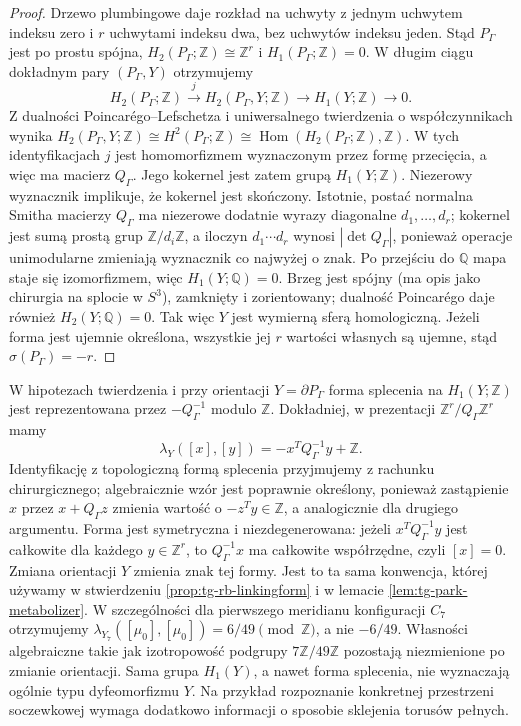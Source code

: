 \begin{proof}
Drzewo plumbingowe daje rozkład na uchwyty z jednym uchwytem indeksu
zero i $r$ uchwytami indeksu dwa, bez uchwytów indeksu jeden.
Stąd $P_\Gamma$ jest po prostu spójna,
$H_2(P_\Gamma;\mathbb Z)\cong\mathbb Z^r$ i
$H_1(P_\Gamma;\mathbb Z)=0$. W długim ciągu dokładnym pary
$(P_\Gamma,Y)$ otrzymujemy
\[
 H_2(P_\Gamma;\mathbb Z)\xrightarrow{j}
 H_2(P_\Gamma,Y;\mathbb Z)\longrightarrow
 H_1(Y;\mathbb Z)\longrightarrow0.
\]
Z dualności Poincar\'ego--Lefschetza i uniwersalnego twierdzenia
o współczynnikach wynika
$H_2(P_\Gamma,Y;\mathbb Z)\cong H^2(P_\Gamma;\mathbb Z)
\cong\operatorname{Hom}(H_2(P_\Gamma;\mathbb Z),\mathbb Z)$.
W tych identyfikacjach $j$ jest homomorfizmem wyznaczonym przez
formę przecięcia, a więc ma macierz $Q_\Gamma$. Jego kokernel
jest zatem grupą $H_1(Y;\mathbb Z)$. Niezerowy wyznacznik
implikuje, że kokernel jest skończony. Istotnie,
postać normalna Smitha macierzy $Q_\Gamma$ ma
niezerowe dodatnie wyrazy diagonalne $d_1,\ldots,d_r$;
kokernel jest sumą prostą grup $\mathbb Z/d_i\mathbb Z$,
a iloczyn $d_1\cdots d_r$ wynosi $|\det Q_\Gamma|$,
ponieważ operacje unimodularne zmieniają wyznacznik
co najwyżej o znak. Po przejściu do $\mathbb Q$ mapa staje się
izomorfizmem, więc $H_1(Y;\mathbb Q)=0$.
Brzeg jest spójny (ma opis jako chirurgia na splocie
w $S^3$), zamknięty i zorientowany; dualność
Poincarégo daje również $H_2(Y;\mathbb Q)=0$.
Tak więc $Y$ jest wymierną sferą homologiczną.
Jeżeli forma jest ujemnie określona, wszystkie jej $r$
wartości własnych są ujemne, stąd $\sigma(P_\Gamma)=-r$.
\end{proof}

\begin{uwaga}
W hipotezach twierdzenia i przy orientacji $Y=\partial P_\Gamma$
forma splecenia na $H_1(Y;\mathbb Z)$ jest reprezentowana
przez $-Q_\Gamma^{-1}$ modulo $\mathbb Z$. Dokładniej,
w prezentacji $\mathbb Z^r/Q_\Gamma\mathbb Z^r$ mamy
\[
 \lambda_Y([x],[y])=-x^TQ_\Gamma^{-1}y+\mathbb Z.
\]
Identyfikację z topologiczną formą splecenia
przyjmujemy z rachunku chirurgicznego; algebraicznie
wzór jest poprawnie określony, ponieważ zastąpienie
$x$ przez $x+Q_\Gamma z$ zmienia wartość o
$-z^Ty\in\mathbb Z$, a analogicznie dla drugiego
argumentu. Forma jest symetryczna i niezdegenerowana:
jeżeli $x^TQ_\Gamma^{-1}y$ jest całkowite dla
każdego $y\in\mathbb Z^r$, to $Q_\Gamma^{-1}x$
ma całkowite współrzędne, czyli $[x]=0$.
Zmiana orientacji $Y$ zmienia znak tej formy.
Jest to ta sama konwencja, której używamy w stwierdzeniu
\ref{prop:tg-rb-linkingform} i w lemacie
\ref{lem:tg-park-metabolizer}. W szczególności dla
pierwszego meridianu konfiguracji $C_7$ otrzymujemy
$\lambda_{Y_7}([\mu_0],[\mu_0])=6/49\pmod{\mathbb Z}$,
a nie $-6/49$. Własności algebraiczne takie jak
izotropowość podgrupy $7\mathbb Z/49\mathbb Z$
pozostają niezmienione po zmianie orientacji.
Sama grupa $H_1(Y)$, a nawet
forma splecenia, nie wyznaczają ogólnie typu dyfeomorfizmu $Y$.
Na przykład rozpoznanie konkretnej przestrzeni soczewkowej
wymaga dodatkowo informacji o sposobie sklejenia torusów pełnych.
\end{uwaga}

